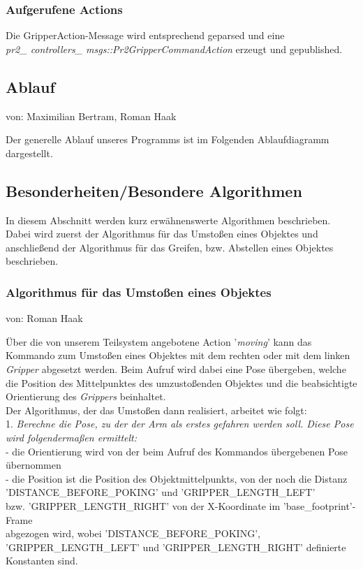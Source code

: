 \documentclass{suturo}
\makeatletter
\newcommand{\chapterauthor}[1]{%
  {\parindent0pt\vspace*{-27pt}%
  \linespread{0}\small\begin{flushright}von: #1\end{flushright}%
  \par\nobreak\vspace*{0pt}}
  \@afterheading%
}
\makeatother
\begin{document}
\subsubsection{Aufgerufene Actions}
Die GripperAction-Message wird entsprechend geparsed und eine \\
 \textit{pr2\_ controllers\_ msgs::Pr2GripperCommandAction} erzeugt und gepublished. \\

\subsection{Ablauf}
\chapterauthor{Maximilian Bertram, Roman Haak}
Der generelle Ablauf unseres Programms ist im Folgenden Ablaufdiagramm dargestellt.


\begin{figure}[!htb]
\end{figure}




\subsection{Besonderheiten/Besondere Algorithmen}
In diesem Abschnitt werden kurz erwähnenswerte Algorithmen beschrieben.
Dabei wird zuerst der Algorithmus für das Umstoßen eines Objektes und anschließend der Algorithmus für das Greifen, bzw. Abstellen eines Objektes beschrieben.\\

\subsubsection{Algorithmus für das Umstoßen eines Objektes}
\chapterauthor{Roman Haak}
Über die von unserem Teilsystem angebotene Action '\textit{moving}' kann das Kommando zum Umstoßen eines Objektes mit dem rechten oder mit dem linken \textit{Gripper} abgesetzt werden. Beim Aufruf wird dabei eine Pose übergeben, welche die Position des Mittelpunktes des umzustoßenden Objektes und die beabsichtigte Orientierung des \textit{Grippers} beinhaltet. \\Der Algorithmus, der das Umstoßen dann realisiert, arbeitet wie folgt:\\

1. \textit{Berechne die Pose, zu der der Arm als erstes gefahren werden soll. Diese Pose wird folgendermaßen ermittelt:}\\
\tab - die Orientierung wird von der beim Aufruf des Kommandos übergebenen Pose übernommen\\
\tab - die Position ist die Position des Objektmittelpunkts, von der noch die Distanz\\ \tab   'DISTANCE\_BEFORE\_POKING' und 'GRIPPER\_LENGTH\_LEFT'\\ \tab bzw. 'GRIPPER\_LENGTH\_RIGHT' von der X-Koordinate im 'base\_footprint'-Frame \\ \tab abgezogen wird, wobei 'DISTANCE\_BEFORE\_POKING', 'GRIPPER\_LENGTH\_LEFT' \tab und 'GRIPPER\_LENGTH\_RIGHT' definierte Konstanten sind.\\
\end{document}
